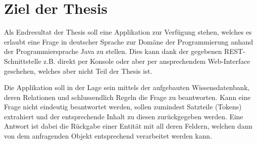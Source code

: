 \chapter{Ziel der Thesis}
\label{chap:thesisziel}
Als Endresultat der Thesis soll eine Applikation zur Verfügung stehen, welches es erlaubt eine Frage in deutscher Sprache zur Domäne der Programmierung anhand der Programmiersprache Java zu stellen. Dies kann dank der gegebenen REST-Schnittstelle z.B. direkt per Konsole oder aber per ansprechendem Web-Interface geschehen, welches aber nicht Teil der Thesis ist.

Die Applikation soll in der Lage sein mittels der aufgebauten Wissensdatenbank, deren Relationen und schlussendlich Regeln die Frage zu beantworten. Kann eine Frage nicht eindeutig beantwortet werden, sollen zumindest Satzteile (Tokens) extrahiert und der entsprechende Inhalt zu diesen zurückgegeben werden. Eine Antwort ist dabei die Rückgabe einer Entität mit all deren Feldern, welchen dann von dem anfragenden Objekt entsprechend verarbeitet werden kann.
